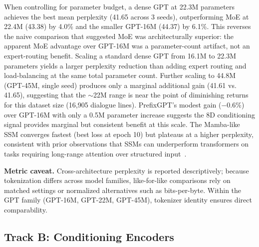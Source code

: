 \documentclass[11pt]{article}
\begin{document}
When controlling for parameter budget, a dense GPT at 22.3M parameters achieves the best mean perplexity (41.65 across 3 seeds), outperforming MoE at 22.4M (43.38) by 4.0\% and the smaller GPT-16M (44.37) by 6.1\%.
This reverses the naive comparison that suggested MoE was architecturally superior: the apparent MoE advantage over GPT-16M was a parameter-count artifact, not an expert-routing benefit.
Scaling a standard dense GPT from 16.1M to 22.3M parameters yields a larger perplexity reduction than adding expert routing and load-balancing at the same total parameter count.
Further scaling to 44.8M (GPT-45M, single seed) produces only a marginal additional gain (41.61 vs. 41.65), suggesting that the $\sim$22M range is near the point of diminishing returns for this dataset size (16,905 dialogue lines).
PrefixGPT's modest gain ($-0.6\%$) over GPT-16M with only a 0.5M parameter increase suggests the 8D conditioning signal provides marginal but consistent benefit at this scale.
The Mamba-like SSM converges fastest (best loss at epoch 10) but plateaus at a higher perplexity, consistent with prior observations that SSMs can underperform transformers on tasks requiring long-range attention over structured input~\cite{gu2023mamba}.

\textbf{Metric caveat.} Cross-architecture perplexity is reported descriptively; because tokenization differs across model families, like-for-like comparisons rely on matched settings or normalized alternatives such as bits-per-byte.
Within the GPT family (GPT-16M, GPT-22M, GPT-45M), tokenizer identity ensures direct comparability.

\subsection{Track B: Conditioning Encoders}

\begin{table}[t]
\centering
\caption{Conditioning encoder evaluation.}
\label{tab:encoders}
\small
{}
\end{table}
\end{document}
